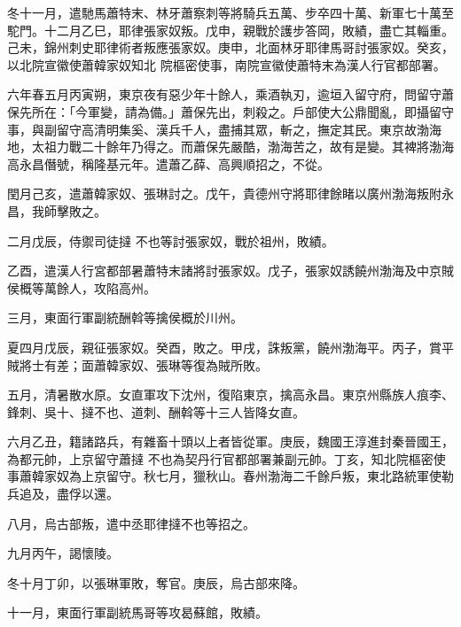 \begin{pinyinscope}
 冬十一月，遣馳馬蕭特末、林牙蕭察刺等將騎兵五萬、步卒四十萬、新軍七十萬至駝門。十二月乙巳，耶律張家奴叛。戊申，親戰於護步答岡，敗績，盡亡其輜重。己未，錦州刺史耶律術者叛應張家奴。庚申，北面林牙耶律馬哥討張家奴。癸亥，以北院宣徽使蕭韓家奴知北
 院樞密使事，南院宣徽使蕭特末為漢人行官都部署。



 六年春五月丙寅朔，東京夜有惡少年十餘人，乘酒執刃，逾垣入留守府，問留守蕭保先所在：「今軍變，請為備。」蕭保先出，刺殺之。戶部使大公鼎聞亂，即攝留守事，與副留守高清明集奚、漢兵千人，盡捕其眾，斬之，撫定其民。東京故渤海地，太祖力戰二十餘年乃得之。而蕭保先嚴酷，渤海苦之，故有是變。其裨將渤海高永昌僭號，稱隆基元年。遣蕭乙薛、高興順招之，不從。



 閏月己亥，遣蕭韓家奴、張琳討之。戊午，貴德州守將耶律餘睹以廣州渤海叛附永昌，我師擊敗之。



 二月戊辰，侍禦司徒撻
 不也等討張家奴，戰於祖州，敗績。



 乙酉，遣漢人行宮都部暑蕭特末諸將討張家奴。戊子，張家奴誘饒州渤海及中京賊侯概等萬餘人，攻陷高州。



 三月，東面行軍副統酬斡等擒侯概於川州。



 夏四月戊辰，親征張家奴。癸酉，敗之。甲戌，誅叛黨，饒州渤海平。丙子，賞平賊將士有差；面蕭韓家奴、張琳等復為賊所敗。



 五月，清暑散水原。女直軍攻下沈州，復陷東京，擒高永昌。東京州縣族人痕李、鋒刺、吳十、撻不也、道刺、酬斡等十三人皆降女直。



 六月乙丑，籍諸路兵，有雜畜十頭以上者皆從軍。庚辰，魏國王淳進封秦晉國王，為都元帥，上京留守蕭撻
 不也為契丹行官都部署兼副元帥。丁亥，知北院樞密使事蕭韓家奴為上京留守。秋七月，獵秋山。春州渤海二千餘戶叛，東北路統軍使勒兵追及，盡俘以還。



 八月，烏古部叛，遣中丞耶律撻不也等招之。



 九月丙午，謁懷陵。



 冬十月丁卯，以張琳軍敗，奪官。庚辰，烏古部來降。



 十一月，東面行軍副統馬哥等攻曷蘇館，敗績。




\end{pinyinscope}
